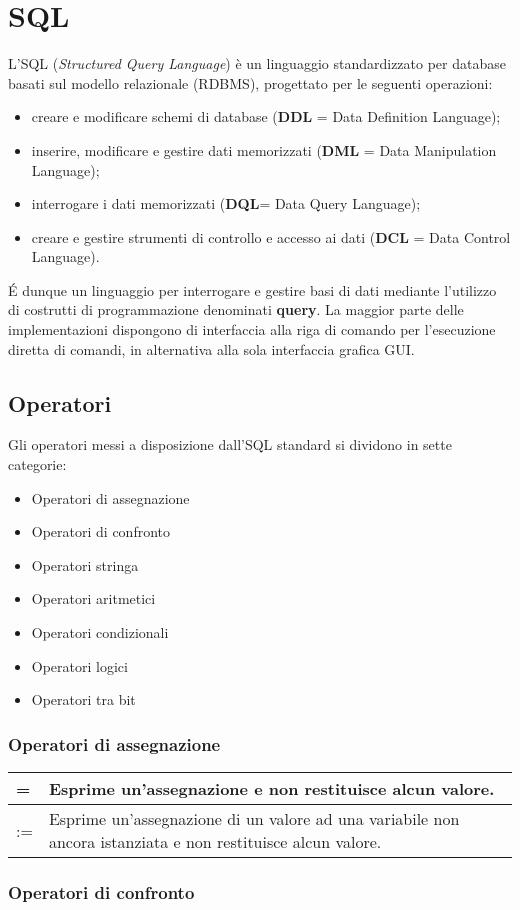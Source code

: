 \documentclass[a4paper]{article}
\begin{document}
\section{SQL}
L'SQL (\emph{Structured Query Language}) è un linguaggio standardizzato per database basati sul modello relazionale (RDBMS), progettato per le seguenti operazioni:
\begin{itemize}
  \item creare e modificare schemi di database (\textbf{DDL} = Data Definition Language);
  \item inserire, modificare e gestire dati memorizzati (\textbf{DML} = Data Manipulation Language);
  \item interrogare i dati memorizzati (\textbf{DQL}= Data Query Language);
  \item creare e gestire strumenti di controllo e accesso ai dati (\textbf{DCL} = Data Control Language).
\end{itemize}\par É dunque un linguaggio per interrogare e gestire basi di dati mediante l'utilizzo di costrutti di programmazione denominati \textbf{query}. La maggior parte delle implementazioni dispongono di interfaccia alla riga di comando per l'esecuzione diretta di comandi, in alternativa alla sola interfaccia grafica GUI.\par \subsection{Operatori}
Gli operatori messi a disposizione dall'SQL standard si dividono in sette categorie:
\begin{itemize}[noitemsep]
  \item Operatori di assegnazione
  \item Operatori di confronto
  \item Operatori stringa
  \item Operatori aritmetici
  \item Operatori condizionali
  \item Operatori logici
  \item Operatori tra bit
\end{itemize}\par \subsubsection{Operatori di assegnazione}
\begin{tabularx}{350pt}{|l|X|}
  \hline
  = & Esprime un'assegnazione e non restituisce alcun valore.\\
  \hline
  := & Esprime un'assegnazione di un valore ad una variabile non ancora istanziata e non restituisce alcun valore.\\
  \hline
\end{tabularx}\par \subsubsection{Operatori di confronto}
\end{document}
